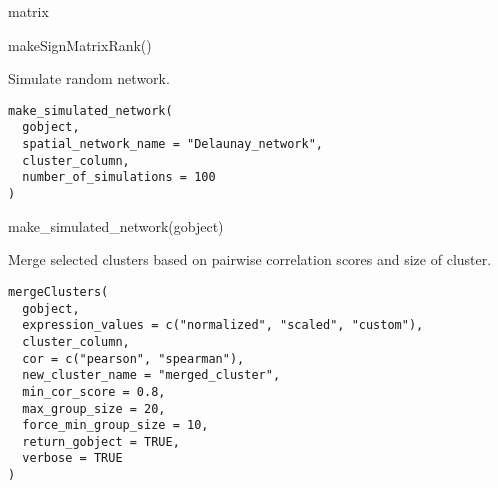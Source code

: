 \documentclass[a4paper]{book}
\begin{document}
%
\begin{Value}
matrix
\end{Value}
%
\begin{SeeAlso}\relax
{}
\end{SeeAlso}
%
\begin{Examples}
\begin{ExampleCode}
    makeSignMatrixRank()
\end{ExampleCode}
\end{Examples}
%
\begin{Description}\relax
Simulate random network.
\end{Description}
%
\begin{Usage}
\begin{verbatim}
make_simulated_network(
  gobject,
  spatial_network_name = "Delaunay_network",
  cluster_column,
  number_of_simulations = 100
)
\end{verbatim}
\end{Usage}
%
\begin{Examples}
\begin{ExampleCode}
    make_simulated_network(gobject)
\end{ExampleCode}
\end{Examples}
%
\begin{Description}\relax
Merge selected clusters based on pairwise correlation scores and size of cluster.
\end{Description}
%
\begin{Usage}
\begin{verbatim}
mergeClusters(
  gobject,
  expression_values = c("normalized", "scaled", "custom"),
  cluster_column,
  cor = c("pearson", "spearman"),
  new_cluster_name = "merged_cluster",
  min_cor_score = 0.8,
  max_group_size = 20,
  force_min_group_size = 10,
  return_gobject = TRUE,
  verbose = TRUE
)
\end{verbatim}
\end{Usage}
%
\end{document}

